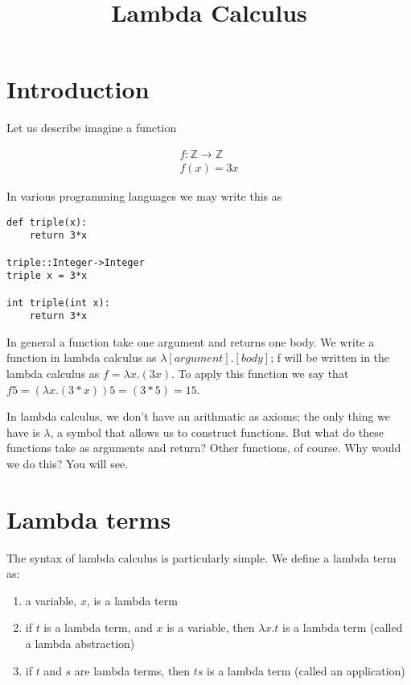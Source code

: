 \documentclass{article}
\title{Lambda Calculus}
\date{}
\begin{document}
\maketitle

\section{Introduction}
Let us describe imagine a function 

\begin{align}
f:\mathbb{Z}\rightarrow\mathbb{Z}\\
f(x) = 3x
\end{align}

In various programming languages we may write this as

\begin{verbatim}
def triple(x):
    return 3*x
    
triple::Integer->Integer
triple x = 3*x

int triple(int x):
    return 3*x
\end{verbatim}

In general a function take one argument and returns one body. We write a function in lambda calculus as $\lambda[argument].[body]$; f will be written in the lambda calculus as $f = \lambda x.(3x)$. To apply this function we say that $f5 = (\lambda x.(3*x))5 = (3*5) = 15$.

In lambda calculus, we don't have an arithmatic as axioms; the only thing we have is $\lambda$, a symbol that allows us to construct functions. But what do these functions take as arguments and return? Other functions, of course. Why would we do this? You will see.

\section{Lambda terms}

The syntax of lambda calculus is particularly simple. We define a lambda term as:

\begin{enumerate}
\item{a variable, $x$, is a lambda term}
\item{if $t$ is a lambda term, and $x$ is a variable, then $\lambda x.t$ is a lambda term (called a lambda abstraction)}
\item{if $t$ and $s$ are lambda terms, then $ts$ is a lambda term (called an application)}
\end{enumerate}
\end{document}
